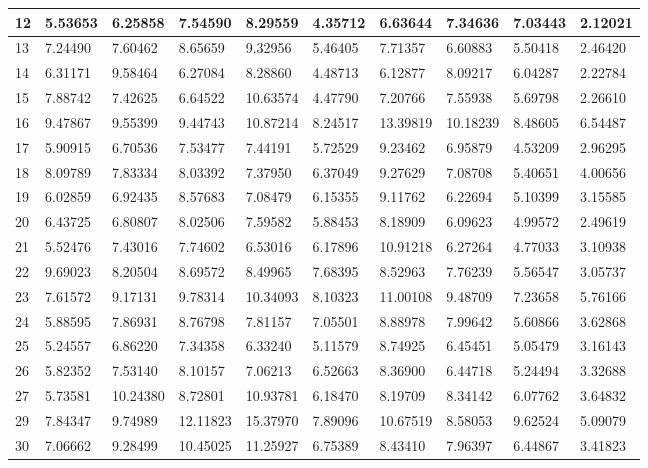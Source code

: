 \begin{table}[H]
{\begin{tabular}{|l|l|l|l|l|l|l|l|l|l|}
        12 & 5.53653 & 6.25858 & 7.54590 & 8.29559 & 4.35712 & 6.63644 & 7.34636 & 7.03443 & 2.12021 \\ \hline
        13 & 7.24490 & 7.60462 & 8.65659 & 9.32956 & 5.46405 & 7.71357 & 6.60883 & 5.50418 & 2.46420 \\ \hline
        14 & 6.31171 & 9.58464 & 6.27084 & 8.28860 & 4.48713 & 6.12877 & 8.09217 & 6.04287 & 2.22784 \\ \hline
        15 & 7.88742 & 7.42625 & 6.64522 & 10.63574 & 4.47790 & 7.20766 & 7.55938 & 5.69798 & 2.26610 \\ \hline
        16 & 9.47867 & 9.55399 & 9.44743 & 10.87214 & 8.24517 & 13.39819 & 10.18239 & 8.48605 & 6.54487 \\ \hline
        17 & 5.90915 & 6.70536 & 7.53477 & 7.44191 & 5.72529 & 9.23462 & 6.95879 & 4.53209 & 2.96295 \\ \hline
        18 & 8.09789 & 7.83334 & 8.03392 & 7.37950 & 6.37049 & 9.27629 & 7.08708 & 5.40651 & 4.00656 \\ \hline
        19 & 6.02859 & 6.92435 & 8.57683 & 7.08479 & 6.15355 & 9.11762 & 6.22694 & 5.10399 & 3.15585 \\ \hline
        20 & 6.43725 & 6.80807 & 8.02506 & 7.59582 & 5.88453 & 8.18909 & 6.09623 & 4.99572 & 2.49619 \\ \hline
        21 & 5.52476 & 7.43016 & 7.74602 & 6.53016 & 6.17896 & 10.91218 & 6.27264 & 4.77033 & 3.10938 \\ \hline
        22 & 9.69023 & 8.20504 & 8.69572 & 8.49965 & 7.68395 & 8.52963 & 7.76239 & 5.56547 & 3.05737 \\ \hline
        23 & 7.61572 & 9.17131 & 9.78314 & 10.34093 & 8.10323 & 11.00108 & 9.48709 & 7.23658 & 5.76166 \\ \hline
        24 & 5.88595 & 7.86931 & 8.76798 & 7.81157 & 7.05501 & 8.88978 & 7.99642 & 5.60866 & 3.62868 \\ \hline
        25 & 5.24557 & 6.86220 & 7.34358 & 6.33240 & 5.11579 & 8.74925 & 6.45451 & 5.05479 & 3.16143 \\ \hline
        26 & 5.82352 & 7.53140 & 8.10157 & 7.06213 & 6.52663 & 8.36900 & 6.44718 & 5.24494 & 3.32688 \\ \hline
        27 & 5.73581 & 10.24380 & 8.72801 & 10.93781 & 6.18470 & 8.19709 & 8.34142 & 6.07762 & 3.64832 \\ \hline
        29 & 7.84347 & 9.74989 & 12.11823 & 15.37970 & 7.89096 & 10.67519 & 8.58053 & 9.62524 & 5.09079 \\ \hline
        30 & 7.06662 & 9.28499 & 10.45025 & 11.25927 & 6.75389 & 8.43410 & 7.96397 & 6.44867 & 3.41823 \\ \hline

\end{tabular}}
\end{table}
